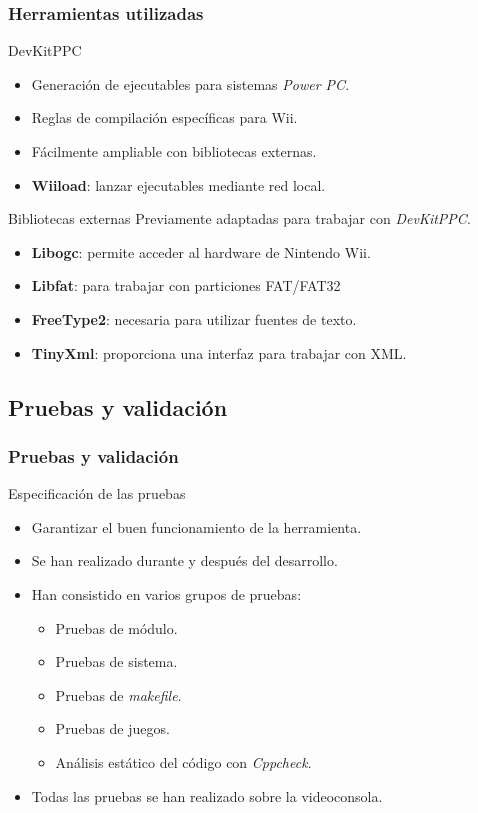 \begin{frame}
\frametitle{Herramientas utilizadas}
	\begin{block}{DevKitPPC}
		\begin{itemize}
			\item Generación de ejecutables para sistemas \textit{Power PC}.
			\item Reglas de compilación específicas para Wii.
			\item Fácilmente ampliable con bibliotecas externas.
			\item \textbf{Wiiload}: lanzar ejecutables mediante red local.
		\end{itemize}
	\end{block}
	\begin{block}{Bibliotecas externas}
		\noindent Previamente adaptadas para trabajar con \textit{DevKitPPC}.
		\begin{itemize}
			\item \textbf{Libogc}: permite acceder al hardware de Nintendo Wii.
			\item \textbf{Libfat}: para trabajar con particiones FAT/FAT32
			\item \textbf{FreeType2}: necesaria para utilizar fuentes de texto.
			\item \textbf{TinyXml}: proporciona una interfaz para trabajar con XML.
		\end{itemize}
	\end{block}
\end{frame}

\subsection{Pruebas y validación}

\begin{frame}
\frametitle{Pruebas y validación}
	\begin{block}{Especificación de las pruebas}
		\begin{itemize}
			\item Garantizar el buen funcionamiento de la herramienta.
			\item Se han realizado durante y después del desarrollo.
			\item Han consistido en varios grupos de pruebas:
			\begin{itemize}
				\item Pruebas de módulo.
				\item Pruebas de sistema.
				\item Pruebas de \textit{makefile}.
				\item Pruebas de juegos.
				\item Análisis estático del código con \textit{Cppcheck}.
			\end{itemize}
			\item Todas las pruebas se han realizado sobre la videoconsola.
		\end{itemize}
	\end{block}
\end{frame}

